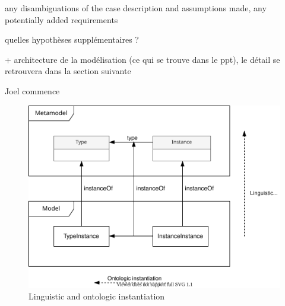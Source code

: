 any disambiguations of the  case  description and assumptions made, any potentially added requirements

quelles hypothèses supplémentaires ? 

+ architecture de la modélisation (ce qui se trouve dans le ppt), le détail se retrouvera dans la section suivante

Joel commence

\begin{figure}
    \centering
    \includegraphics[width=1.0 \columnwidth]{Figures/Instantiation.svg}
    \caption{Linguistic and ontologic instantiation}
    \label{fig:LinguisticAndOntologicInstantiation}
\end{figure}


